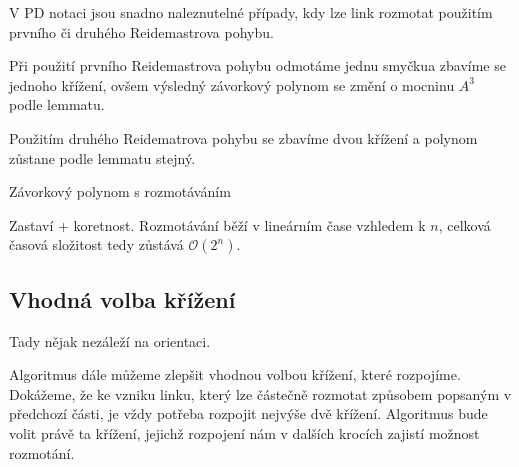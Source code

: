 V PD notaci jsou snadno naleznutelné případy, kdy lze link rozmotat použitím prvního či druhého Reidemastrova pohybu.

Při použití prvního Reidemastrova pohybu odmotáme jednu smyčkua zbavíme se jednoho křížení, ovšem výsledný závorkový polynom se změní o mocninu $A^3$ podle lemmatu.

Použitím druhého Reidematrova pohybu se zbavíme dvou křížení a polynom zůstane podle lemmatu stejný.

\begin{algorithm}[H]

\DontPrintSemicolon

%




\caption{Závorkový polynom s rozmotáváním} 
\end{algorithm}

Zastaví + koretnost.
Rozmotávání běží v lineárním čase vzhledem k $n$, celková časová složitost tedy zůstává $\mathcal{O}(2^n)$.

\subsection{Vhodná volba křížení}
Tady nějak nezáleží na orientaci.

Algoritmus dále můžeme zlepšit vhodnou volbou křížení, které rozpojíme.
Dokážeme, že ke vzniku linku, který lze částečně rozmotat způsobem popsaným v předchozí části, je vždy potřeba rozpojit nejvýše dvě křížení.
Algoritmus bude volit právě ta křížení, jejichž rozpojení nám v dalších krocích zajistí možnost rozmotání.

